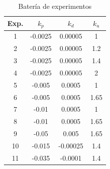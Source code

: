 \begin{table}[H]
\begin{center}
\begin{tabular}{|c|c|c|c|}
\hline
\rowcolor[gray]{0.9}
\cellcolor[gray]{0.7}Exp. & $k_p$   & $k_d$    & $k_u$ \\ \hline
1    & -0.0025 & 0.00005  & 1    \\ \hline
2    & -0.0025 & 0.00005  & 1.2  \\ \hline
3    & -0.0025 & 0.00005  & 1.4  \\ \hline
4    & -0.0025 & 0.00005  & 2    \\ \hline
5    & -0.005  & 0.0005   & 1    \\ \hline
6    & -0.005  & 0.0005   & 1.65 \\ \hline
7    & -0.01   & 0.0005   & 1    \\ \hline
8    & -0.01   & 0.0005   & 1.65 \\ \hline
9    & -0.05   & 0.005    & 1.65 \\ \hline
10   & -0.015  & -0.00025 & 1.4  \\ \hline
11   & -0.035  & -0.0001  & 1.4  \\ \hline
\end{tabular}
\end{center}
\caption{Batería de experimentos}
\label{tabla51}
\end{table}

